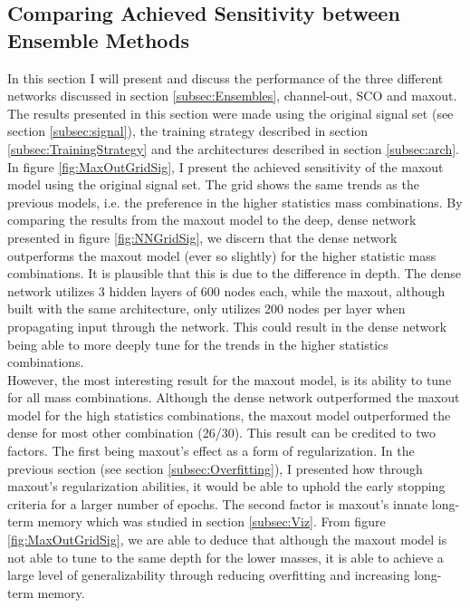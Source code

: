 \subsection{Comparing Achieved Sensitivity between Ensemble Methods}
In this section I will present and discuss the performance of the three different networks discussed in section 
\ref{subsec:Ensembles}, channel-out, \ac{SCO} and maxout. The results presented in this section were made using the
original signal set (see section \ref{subsec:signal}), the training strategy described in section \ref{subsec:TrainingStrategy}
and the architectures described in section \ref{subsec:arch}.
\\
In figure \ref{fig:MaxOutGridSig}, I present the achieved sensitivity of the maxout model using the original signal set. 
The grid shows the same trends as the previous models, i.e. the preference in the higher statistics mass combinations. By comparing 
the results from the maxout model to the deep, dense network presented in figure \ref{fig:NNGridSig}, we discern that the dense 
network outperforms the maxout model (ever so slightly) for the higher statistic mass combinations. It is plausible that this is due 
to the difference in depth. The dense network utilizes 3 hidden layers of 600 nodes each, while the maxout, although built with the 
same architecture, only utilizes 200 nodes per layer when propagating input through the network. This could result in the dense network 
being able to more deeply tune for the trends in the higher statistics combinations.
\\
However, the most interesting result for the maxout model, is its ability to tune for all mass combinations. Although the dense network
outperformed the maxout model for the high statistics combinations, the maxout model outperformed the dense for most other combination (26/30).
This result can be credited to two factors. The first being maxout's effect as a form of regularization. In the previous 
section (see section \ref{subsec:Overfitting}), I presented how through maxout's regularization abilities, it would be able to 
uphold the early stopping criteria for a larger number of epochs. The second factor is maxout's innate long-term memory which was studied
in section \ref{subsec:Viz}. From figure \ref{fig:MaxOutGridSig}, we are able to deduce that although the maxout model is not able to tune 
to the same depth for the lower masses, it is able to achieve a large level of generalizability through reducing overfitting and increasing 
long-term memory.\\
